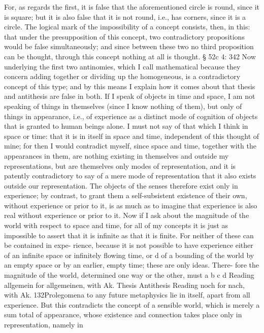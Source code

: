 For, as regards the ﬁrst, it is false that the aforementioned circle is round,
since it is square; but it is also false that it is not round, i.e., has corners,
since it is a circle. The logical mark of the impossibility of a concept
consists, then, in this: that under the presupposition of this concept,
two contradictory propositions would be false simultaneously; and since
between these two no third proposition can be thought, through this
concept nothing at all is thought.
§ 52c
4: 342
Now underlying the ﬁrst two antinomies, which I call mathematical
because they concern adding together or dividing up the homogeneous,
is a contradictory concept of this type; and by this means I explain how
it comes about that thesis and antithesis are false in both.
If I speak of objects in time and space, I am not speaking of things
in themselves (since I know nothing of them), but only of things in
appearance, i.e., of experience as a distinct mode of cognition of objects
that is granted to human beings alone. I must not say of that which I
think in space or time: that it is in itself in space and time, independent
of this thought of mine; for then I would contradict myself, since space
and time, together with the appearances in them, are nothing existing
in themselves and outside my representations, but are themselves only
modes of representation, and it is patently contradictory to say of a mere
mode of representation that it also exists outside our representation. The
objects of the senses therefore exist only in experience; by contrast, to
grant them a self-subsistent existence of their own, without experience
or prior to it, is as much as to imagine that experience is also real without
experience or prior to it.
Now if I ask about the magnitude of the world with respect to space
and time, for all of my concepts it is just as impossible to assert that it is
inﬁnite as that it is ﬁnite. For neither of these can be contained in expe-
rience, because it is not possible to have experience either of an inﬁnite
space or inﬁnitely ﬂowing time, or d of a bounding of the world by an
empty space or by an earlier, empty time; these are only ideas. There-
fore the magnitude of the world, determined one way or the other, must
a
b
c
d
Reading allgemein for allgemeinen, with Ak.
Thesis
Antithesis
Reading noch for nach, with Ak.
132Prolegomena to any future metaphysics
lie in itself, apart from all experience. But this contradicts the concept
of a sensible world, which is merely a sum total of appearance, whose
existence and connection takes place only in representation, namely in

